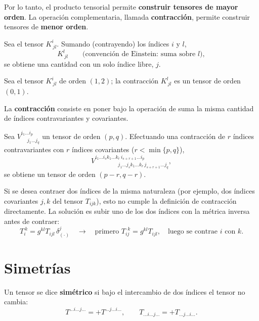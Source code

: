 Por lo tanto, el producto tensorial permite \textbf{construir tensores de
mayor orden}. La operación complementaria, llamada \textbf{contracción},
permite construir tensores de \textbf{menor orden}.

\begin{ejemplo}
Sea el tensor $K^i_{\ jl}$. Sumando (contrayendo) los índices $i$ y $l$,
\[
K^l_{\ jl} \qquad \text{(convención de Einstein: suma sobre } l\text{)},
\]
se obtiene una cantidad con un solo índice libre, $j$.
\end{ejemplo}

\begin{proposicionc}
Sea el tensor $K^i_{\ jl}$ de orden $(1,2)$; la contracción $K^l_{\ jl}$
es un tensor de orden $(0,1)$.
\end{proposicionc}

\begin{definicion}[Contracción]
La \textbf{contracción} consiste en poner bajo la operación de suma la
misma cantidad de índices contravariantes y covariantes.
\end{definicion}

\begin{proposicionc}
Sea $V^{i_1\dots i_p}_{\quad\ j_1\dots j_q}$ un tensor de orden $(p,q)$.
Efectuando una contracción de $r$ índices contravariantes con $r$
índices covariantes ($r<\min\{p,q\}$),
\[
V^{i_1\dots i_s k_1\dots k_r\, i_{s+r+1}\dots i_p}_{\quad\quad\quad\quad\
\ \, j_1\dots j_s k_1\dots k_r\, j_{s+r+1}\dots j_q},
\]
se obtiene un tensor de orden $(p-r,q-r)$.
\end{proposicionc}

\begin{observacion}
Si se desea contraer dos índices de la misma naturaleza (por ejemplo, dos
índices covariantes $j,k$ del tensor $T_{ijk}$), esto no cumple la
definición de contracción directamente. La solución es subir uno de los
dos índices con la métrica inversa antes de contraer:
\[
T_i^{\ k} = g^{kl}T_{ijl}\, \delta^j_{(\cdot)} \quad\longrightarrow\quad
\text{primero } T^{\ \ k}_{ij} = g^{kl}T_{ijl}, \quad\text{luego se
contrae } i \text{ con } k.
\]
\end{observacion}

\section{Simetrías}

\begin{definicion}
Un tensor se dice \textbf{simétrico} si bajo el intercambio de dos
índices el tensor no cambia:
\[
T^{\dots i\dots j\dots} = +T^{\dots j\dots i\dots}, \qquad T_{\dots
i\dots j\dots} = +T_{\dots j\dots i\dots}.
\]
\end{definicion}

